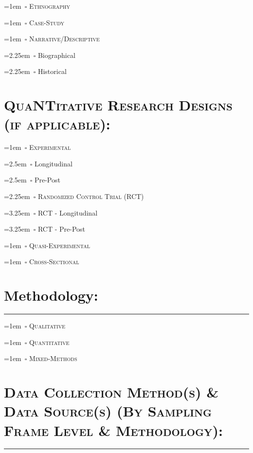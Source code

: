 \documentclass[11pt,]{tufte-book}
\newcommand{\Frule}{
    \vspace*{-1em}
    \begin{fullwidth}\textcolor{blublk}{\rule{\linewidth}{0.2mm}}\end{fullwidth}
}
\begin{document}
\parindent=1em~\(\square\) \textsc{Ethnography}

\parindent=1em~\(\square\) \textsc{Case-Study}

\parindent=1em~\(\square\) \textsc{Narrative/Descriptive}

\parindent=2.25em~\(\square\) Biographical

\parindent=2.25em~\(\square\) Historical

\section{\texorpdfstring{\textsc{Qua\LARGE{NT}itative Research Designs (if applicable):}}{}}\label{section-3}

\parindent=1em~\(\square\) \textsc{Experimental}

\parindent=2.5em~\(\square\) Longitudinal

\parindent=2.5em~\(\square\) Pre-Post

\parindent=2.25em~\(\square\) \textsc{Randomized Control Trial (RCT)}

\parindent=3.25em~\(\square\) RCT - Longitudinal

\parindent=3.25em~\(\square\) RCT - Pre-Post

\parindent=1em~\(\square\) \textsc{Quasi-Experimental}

\parindent=1em~\(\square\) \textsc{Cross-Sectional}

\section{Methodology:}\label{methodology}

\Frule

\parindent=1em~\(\square\) \textsc{Qualitative}

\parindent=1em~\(\square\) \textsc{Quantitative}

\parindent=1em~\(\square\) \textsc{Mixed-Methods}

\tufteskip

\section{\texorpdfstring{\textsc{Data Collection Method(s) \& Data Source(s) (By Sampling Frame Level \& Methodology):}}{}}\label{section-4}

\Frule


\end{document}
